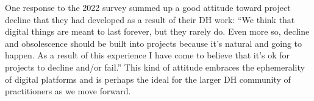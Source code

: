 \documentclass[final]{anthology-ch}
\begin{document}
One response to the 2022 survey summed up a good attitude toward project decline that they had developed as a result of their DH work: \enquote{We think that digital things are meant to last forever, but they rarely do. Even more so, decline and obsolescence should be built into projects because it's natural and going to happen. As a result of this experience I have come to believe that it's ok for projects to decline and/or fail.} This kind of attitude embraces the ephemerality of digital platforms and is perhaps the ideal for the larger DH community of practitioners as we move forward.

\printbibliography
\end{document}

